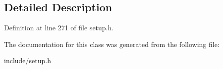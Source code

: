 \subsection{Detailed Description}


Definition at line 271 of file setup.\-h.



The documentation for this class was generated from the following file\-:\begin{DoxyCompactItemize}
\item 
include/setup.\-h\end{DoxyCompactItemize}
